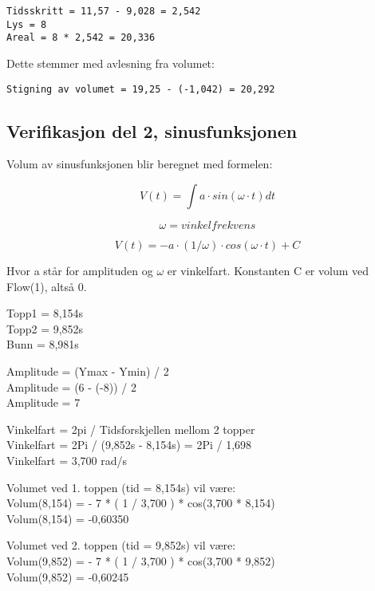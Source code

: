 \begin{verbatim}
Tidsskritt = 11,57 - 9,028 = 2,542
Lys = 8
Areal = 8 * 2,542 = 20,336
\end{verbatim}

Dette stemmer med avlesning fra volumet:
\begin{verbatim}
Stigning av volumet = 19,25 - (-1,042) = 20,292
\end{verbatim}

\subsection{Verifikasjon del 2, sinusfunksjonen}

Volum av sinusfunksjonen blir beregnet med formelen:

\begin{equation}
V(t) = \int a·sin(\omega·t)dt
\end{equation}

\begin{equation}
\omega = vinkelfrekvens  
\end{equation}

\begin{equation}
V(t) = -a · (1 /\omega) · cos(\omega·t) + C
\end{equation}

Hvor a står for amplituden og $\omega$ er vinkelfart. Konstanten C er volum ved Flow(1), altså 0.

\begin{figure}[H]
\centering
\end{figure}

Topp1 = 8,154s \\
Topp2 = 9,852s \\
Bunn = 8,981s

Amplitude = (Ymax - Ymin) / 2 \\
Amplitude = (6 - (-8)) / 2 \\
Amplitude = 7

Vinkelfart = 2pi / Tidsforskjellen mellom 2 topper \\
Vinkelfart = 2Pi / (9,852s - 8,154s) = 2Pi / 1,698 \\
Vinkelfart = 3,700 rad/s

Volumet ved 1. toppen (tid = 8,154s) vil være: \\
Volum(8,154) = - 7 * ( 1 / 3,700 ) * cos(3,700 * 8,154) \\
Volum(8,154) = -0,60350

Volumet ved 2. toppen (tid = 9,852s) vil være: \\
Volum(9,852) = - 7 * ( 1 / 3,700 ) * cos(3,700 * 9,852) \\
Volum(9,852) = -0,60245

